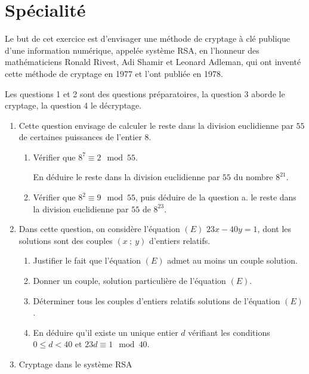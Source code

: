 \documentclass{cornouaille}
\begin{document}
\section{Spécialité}
\begin{exercice}[Spécialité][5]


\medskip

Le but de cet exercice est d'envisager une méthode de cryptage à clé publique d'une information
numérique, appelée système RSA, en l'honneur des mathématiciens Ronald Rivest, Adi Shamir et
Leonard Adleman, qui ont inventé cette méthode de cryptage en 1977 et l'ont publiée en 1978.

\smallskip

Les questions 1 et 2 sont des questions préparatoires, la question 3 aborde le cryptage, la question 4
le décryptage.

\bigskip

\begin{enumerate}
\item Cette question envisage de calculer le reste dans la division euclidienne par $55$ de certaines
puissances de l'entier $8$.
	\begin{enumerate}
		\item Vérifier que $8^7 \equiv 2 \mod 55$.
		
En déduire le reste dans la division euclidienne par $55$ du nombre $8^{21}$.
		\item Vérifier que $8^2 \equiv 9 \mod 55$, puis déduire de la question a. le reste dans la division
euclidienne par $55$ de $8^{23}$.
 	\end{enumerate}
\item  Dans cette question, on considère l'équation $(E)$\: $23 x - 40 y = 1$, dont les solutions sont des
couples $(x~;~y)$ d'entiers relatifs.
	\begin{enumerate}
		\item Justifier le fait que l'équation $(E)$ admet au moins un couple solution.
		\item  Donner un couple, solution particulière de l'équation $(E)$.
		\item  Déterminer tous les couples d'entiers relatifs solutions de l'équation $(E)$.
		\item  En déduire qu'il existe un unique entier $d$ vérifiant les conditions $0 \leqslant d < 40$ et
$23 d \equiv  1 \mod 40$.
 	\end{enumerate}
\item  Cryptage dans le système RSA
	

\end{enumerate}
\end{exercice}
\end{document}
